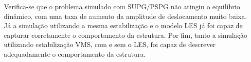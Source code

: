 Verifica-se que o problema simulado com SUPG/PSPG não atingiu o equilíbrio dinâmico, com uma taxa de aumento da amplitude de deslocamento muito baixa. Já a simulação utilizando a mesma estabilização e o modelo LES já foi capaz de capturar corretamente o comportamento da estrutura. Por fim, tanto a simulação utilizando estabilização VMS, com e sem o LES, foi capaz de descrever adequadamente o comportamento da estrutura.